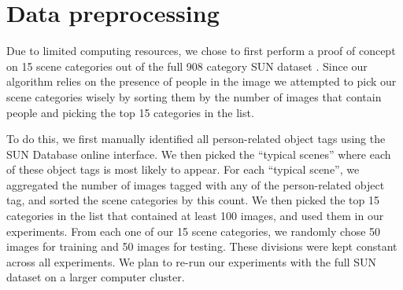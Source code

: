 \documentclass[11pt]{article}
\begin{document}




\section{Data preprocessing}

Due to limited computing resources, we chose to first perform a proof of concept on 15 scene categories out of the full 908 category SUN dataset \cite{SUN}. Since our algorithm relies on the presence of people in the image we attempted to pick our scene categories wisely by sorting them by the number of images that contain people and picking the top 15 categories in the list.

To do this, we first manually identified all person-related object tags using the SUN Database online interface. We then picked the ``typical scenes'' where each of these object tags is most likely to appear. For each ``typical scene'', we aggregated the number of images tagged with any of the person-related object tag, and sorted the scene categories by this count. We then picked the top 15 categories in the list that contained at least 100 images, and used them in our experiments. From each one of our 15 scene categories, we randomly chose 50 images for training and 50 images for testing. These divisions were kept constant across all experiments. We plan to re-run our experiments with the full SUN dataset on a larger computer cluster.
\end{document}

